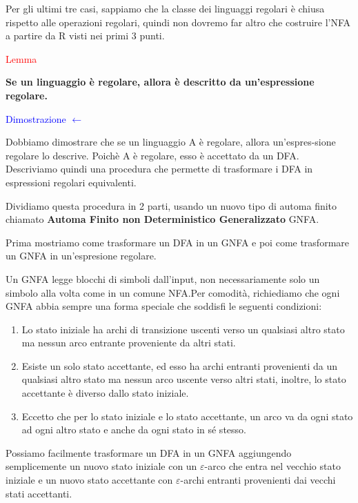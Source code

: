 \documentclass{article}
\begin{document}
    Per gli ultimi tre casi, sappiamo che la classe dei linguaggi regolari è
    chiusa rispetto alle operazioni regolari, quindi non dovremo far altro che
    costruire l'NFA a partire da R visti nei primi 3 punti.

\begin{center}
    \textcolor{red}{Lemma}

    \textbf{Se un linguaggio è regolare, allora è descritto da un'espressione regolare.}
\end{center}

\textcolor{blue}{Dimostrazione $\leftarrow$}

Dobbiamo dimostrare che se un linguaggio A è regolare, allora un'espres-sione
regolare lo descrive. Poichè A è regolare, esso è accettato da un DFA.
Descriviamo quindi una procedura che permette di trasformare i DFA in
espressioni regolari equivalenti.

Dividiamo questa procedura in 2 parti, usando un nuovo tipo di automa finito
chiamato \textbf{Automa Finito non Deterministico Generalizzato} GNFA.

Prima mostriamo come trasformare un DFA in un GNFA e poi come trasformare un
GNFA in un'espresione regolare. 

Un GNFA legge blocchi di simboli dall'input, non necessariamente solo un simbolo
alla volta come in un comune NFA.Per comodità, richiediamo che ogni GNFA abbia
sempre una forma speciale che soddisfi le seguenti condizioni:

\begin{enumerate}
    \item Lo stato iniziale ha archi di transizione uscenti verso un qualsiasi
    altro stato ma nessun arco entrante proveniente da altri stati.
    \item Esiste un solo stato accettante, ed esso ha archi entranti provenienti
    da un qualsiasi altro stato ma nessun arco uscente verso altri stati,
    inoltre, lo stato accettante è diverso dallo stato iniziale.
    \item Eccetto che per lo stato iniziale e lo stato accettante, un arco va da
    ogni stato ad ogni altro stato e anche da ogni stato in sé stesso.
\end{enumerate}

Possiamo facilmente trasformare un DFA in un GNFA aggiungendo semplicemente un
nuovo stato iniziale con un $\varepsilon$-arco che entra nel vecchio stato
iniziale e un nuovo stato accettante con $\varepsilon$-archi entranti
provenienti dai vecchi stati accettanti.
\end{document}
